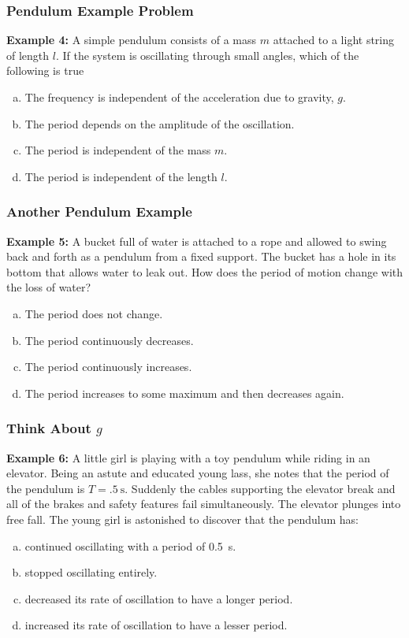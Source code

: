 \documentclass[12pt,compress,aspectratio=169]{beamer}
\begin{document}
\begin{frame}
  \frametitle{Pendulum Example Problem}
  \textbf{Example 4:} A simple pendulum consists of a mass $m$ attached to a
  light string of length $l$. If the system is oscillating through small
  angles, which of the following is true
  \begin{enumerate}[(a)]
  \item The frequency is independent of the acceleration due to gravity, $g$.
  \item The period depends on the amplitude of the oscillation.
  \item The period is independent of the mass $m$.
  \item The period is independent of the length $l$.
  \end{enumerate}
\end{frame}


\begin{frame}
  \frametitle{Another Pendulum Example}
  \textbf{Example 5:} A bucket full of water is attached to a rope and allowed
  to swing back and forth as a pendulum from a fixed support. The bucket has a
  hole in its bottom that allows water to leak out. How does the period of
  motion change with the loss of water?
  \begin{enumerate}[(a)]
  \item The period does not change.
  \item The period continuously decreases.
  \item The period continuously increases.
  \item The period increases to some maximum and then decreases again.
  \end{enumerate}
\end{frame}


\begin{frame}
  \frametitle{Think About $g$}
  \textbf{Example 6:} A little girl is playing with a toy pendulum while riding
  in an elevator. Being an astute and educated young lass, she notes that the 
  period of the pendulum is $T=\SI{.5}{\second}$. Suddenly the cables
  supporting the elevator break and all  of the brakes and safety features fail
  simultaneously. The elevator plunges into free fall. The young girl is
  astonished to discover that the pendulum has:
  \begin{enumerate}[(a)]
  \item continued oscillating with a period of \SI{.5}{\second}.
  \item stopped oscillating entirely.
  \item decreased its rate of oscillation to have a longer period.
  \item increased its rate of oscillation to have a lesser period.
  \end{enumerate}
\end{frame}
\end{document}
